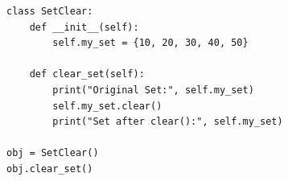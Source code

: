 \begin{verbatim}
class SetClear:
    def __init__(self):
        self.my_set = {10, 20, 30, 40, 50}

    def clear_set(self):
        print("Original Set:", self.my_set)
        self.my_set.clear()
        print("Set after clear():", self.my_set)

obj = SetClear()
obj.clear_set()
\end{verbatim}